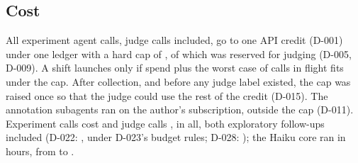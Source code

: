 \subsection{Cost}
All experiment agent calls, judge calls included, go to one API credit (D-001) under one ledger with a hard cap of \wtthDesignCapUsd, of which \wtthDesignJudgeReserveUsd{} was reserved for judging (D-005, D-009).
A shift launches only if spend plus the worst case of calls in flight fits under the cap.
After collection, and before any judge label existed, the cap was raised once so that the judge could use the rest of the credit (D-015).
The annotation subagents ran on the author's subscription, outside the cap (D-011).
Experiment calls cost \wtthCostMainUsd{} and judge calls \wtthCostJudgeUsd, \wtthCostTotalUsd{} in all, both exploratory follow-ups included (D-022: \wtthCostExpOneTotalUsd, under D-023's budget rules; D-028: \wtthCostExpTwoTotalUsd); the Haiku core ran in \wtthOpsCoreWallHours{} hours, from \wtthOpsCoreStart{} to \wtthOpsCoreEnd.
\begin{center}
\end{center}
